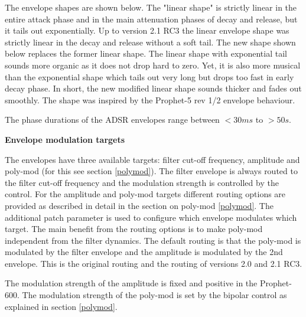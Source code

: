  The envelope shapes are shown below. The "linear shape" is strictly linear in the entire attack phase and in the main attenuation phases of decay and release, but it tails out exponentially. Up to version 2.1 RC3 the linear envelope shape was strictly linear in the decay and release without a soft tail. The new shape shown below replaces the former linear shape. The linear shape with exponential tail sounds more organic as it does not drop hard to zero. Yet, it is also more musical than the exponential shape which tails out very long but drops too fast in early decay phase. In short, the new modified linear shape sounds thicker and fades out smoothly. The shape was inspired by the Prophet-5 rev 1/2 envelope behaviour. 
 

The phase durations of the ADSR envelopes range between $<30 ms$ to $>50 s$.

\textbf{Envelope modulation targets}
 
The envelopes have three available targets: filter cut-off frequency, amplitude and poly-mod (for this see section \ref{polymod}). The filter envelope is always routed to the filter cut-off frequency and the modulation strength is controlled by the \filenv control. For the  amplitude and poly-mod targets different routing options are provided as described in detail in the section on poly-mod \ref{polymod}. The additional patch parameter \envrouting is used to configure which envelope modulates which target. The main benefit from the routing options is to make poly-mod independent from the filter dynamics. The default routing is that the poly-mod is modulated by the filter envelope and the amplitude is modulated by the 2nd envelope. This is the original routing and the routing of versions 2.0 and 2.1 RC3. 

The modulation strength of the amplitude is fixed and positive in the Prophet-600. The modulation strength of the poly-mod is set by the bipolar \polymodenv control as explained in section \ref{polymod}. 
